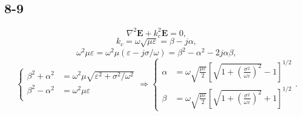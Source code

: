 \documentclass[11pt,a4paper]{article}
\begin{document}
\subsection{8-9}
$$\nabla^2\mathbf{E}+k_c^2\mathbf{E}=0,$$
$$k_c=\omega\sqrt{\mu\varepsilon}=\beta-j\alpha,$$
$$\omega^2\mu\varepsilon=\omega^2\mu(\varepsilon-j\sigma/\omega)=\beta^2-\alpha^2-2j\alpha\beta,$$
$$\left\{\begin{aligned}
\beta^2+\alpha^2&=\omega^2\mu\sqrt{\varepsilon^2+\sigma^2/\omega^2}\\
\beta^2-\alpha^2&=\omega^2\mu\varepsilon\\
\end{aligned}\right.\Longrightarrow\left\{\begin{aligned}
\alpha&=\omega\sqrt{\frac{\mu\varepsilon}{2}}\left[\sqrt{1+\left(\frac{\sigma^2}{\omega\varepsilon}\right)^2}-1\right]^{1/2}\\
\beta&=\omega\sqrt{\frac{\mu\varepsilon}{2}}\left[\sqrt{1+\left(\frac{\sigma^2}{\omega\varepsilon}\right)^2}+1\right]^{1/2}
\end{aligned}\right..$$
\end{document}
